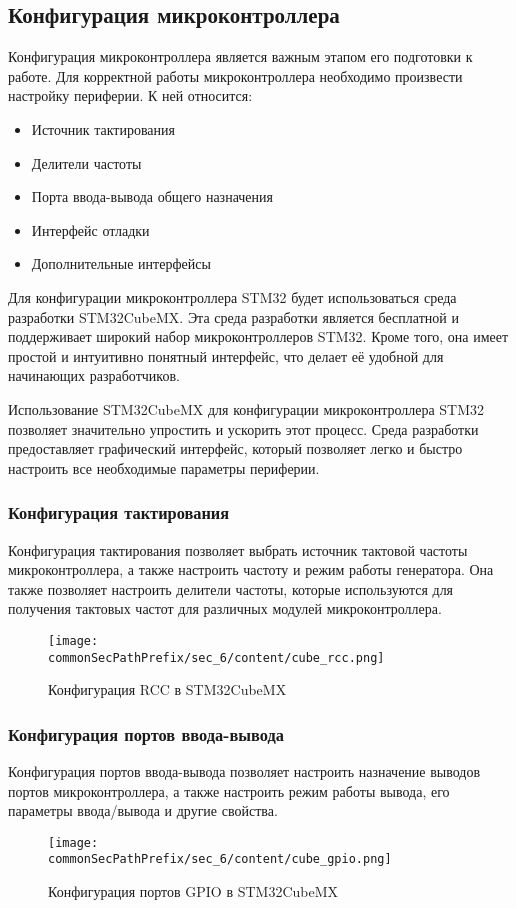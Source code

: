 \subsection{Конфигурация микроконтроллера}
Конфигурация микроконтроллера является важным этапом его подготовки к работе. Для корректной работы микроконтроллера необходимо произвести настройку периферии. К ней относится:
\begin{itemize}
    \item Источник тактирования
    \item Делители частоты
    \item Порта ввода-вывода общего назначения
    \item Интерфейс отладки
    \item Дополнительные интерфейсы
\end{itemize}
Для конфигурации микроконтроллера STM32 будет использоваться среда разработки STM32CubeMX. Эта среда разработки является бесплатной и поддерживает широкий набор микроконтроллеров STM32. Кроме того, она имеет простой и интуитивно понятный интерфейс, что делает её удобной для начинающих разработчиков.

Использование STM32CubeMX для конфигурации микроконтроллера STM32 позволяет значительно упростить и ускорить этот процесс. Среда разработки предоставляет графический интерфейс, который позволяет легко и быстро настроить все необходимые параметры периферии.

\subsubsection{Конфигурация тактирования}
Конфигурация тактирования позволяет выбрать источник тактовой частоты микроконтроллера, а также настроить частоту и режим работы генератора. Она также позволяет настроить делители частоты, которые используются для получения тактовых частот для различных модулей микроконтроллера.
\begin{figure}[h!]
    \centering
    \texttt{[image: \\commonSecPathPrefix/sec\_6/content/cube\_rcc.png]}
    \caption{Конфигурация RCC в STM32CubeMX}
\end{figure}

\subsubsection{Конфигурация портов ввода-вывода}
Конфигурация портов ввода-вывода позволяет настроить назначение выводов портов микроконтроллера, а также настроить режим работы вывода, его параметры ввода/вывода и другие свойства.
\begin{figure}[h!]
    \centering
    \texttt{[image: \\commonSecPathPrefix/sec\_6/content/cube\_gpio.png]}
    \caption{Конфигурация портов GPIO в STM32CubeMX}
\end{figure}

